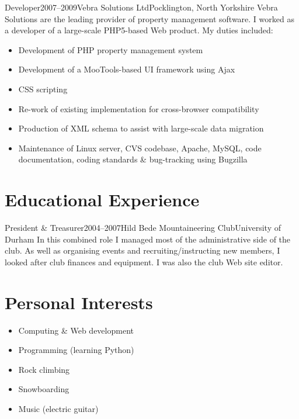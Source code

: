 \documentclass{cv}
\begin{document}
\begin{experience}{Developer}{2007--2009}{Vebra Solutions Ltd}{Pocklington, North Yorkshire}
Vebra Solutions are the leading provider of property management software. I worked as a developer of a large-scale PHP5-based Web product. My duties included:
\begin{itemize}
\item Development of PHP property management system
\item Development of a MooTools-based UI framework using Ajax
\item CSS scripting
\item Re-work of existing implementation for cross-browser compatibility
\item Production of XML schema to assist with large-scale data migration
\item Maintenance of Linux server, CVS codebase, Apache, MySQL, code documentation, coding standards \& bug-tracking using Bugzilla
\end{itemize}
\end{experience}

\section{Educational Experience}

\begin{experience}{President \& Treasurer}{2004--2007}{Hild Bede Mountaineering Club}{University of Durham}
In this combined role I managed most of the administrative side of the club. As well as organising events and recruiting/instructing new members, I looked after club finances and equipment. I was also the club Web site editor.
\end{experience}

\section{Personal Interests}

\begin{itemize}
\item Computing \& Web development
\item Programming (learning Python)
\item Rock climbing
\item Snowboarding
\item Music (electric guitar)
\end{itemize}
\end{document}
